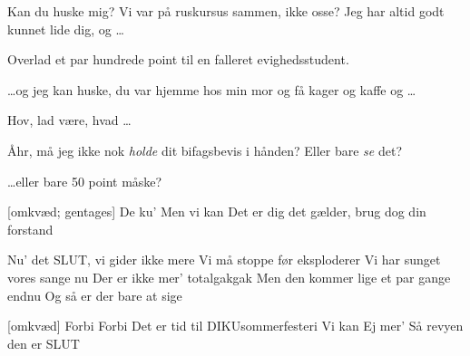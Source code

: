 \documentclass[a4paper,11pt]{article}
\begin{document}
\begin{sketch}


 Kan du huske mig?  Vi var på ruskursus sammen, ikke osse?  Jeg har altid godt kunnet lide dig, og \ldots

 Overlad et par hundrede point til en falleret evighedsstudent.

 \ldots og jeg kan huske, du var hjemme hos min mor og få kager og kaffe og \ldots


 Hov, lad være, hvad \ldots

 Åhr, må jeg ikke nok \emph{holde} dit bifagsbevis i hånden?  Eller bare \emph{se} det?

 \ldots eller bare 50 point måske?


\end{sketch}

\begin{song}

[omkvæd; gentages] De ku'
  Men vi kan
  Det er dig det gælder, brug dog din forstand

 Nu' det SLUT, vi gider ikke mere
  Vi må stoppe før eksploderer
  Vi har sunget vores sange nu
  Der er ikke mer' totalgakgak
  Men den kommer lige et par gange endnu
  Og så er der bare at sige



[omkvæd] Forbi
  Forbi
  Det er tid til DIKUsommerfesteri
  Vi kan
  Ej mer'
  Så revyen den er SLUT


\end{song}
\end{document}
